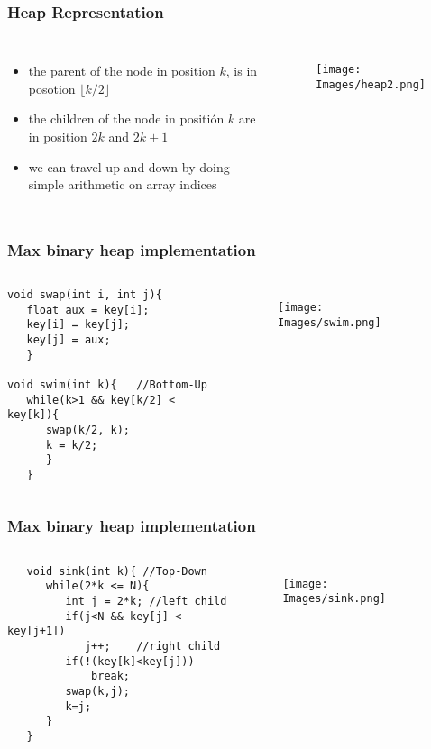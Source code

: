 \documentclass{beamer}
\begin{document}
\begin{frame}
\frametitle{Heap Representation}
\begin{columns}[c] %
\begin{itemize}
\item the parent of the node in position $k$, is in posotion $\lfloor k/2 \rfloor$
\item the children of the node in positión $k$ are in position $2k$ and $2k+1$
\item we can travel up and down by doing simple arithmetic on array indices
\end{itemize}
\begin{figure}[h]
\texttt{[image: Images/heap2.png]}
\centering
\end{figure}
\end{columns}

\end{frame}
\begin{frame}[fragile]
\frametitle{Max binary heap implementation}
\begin{columns}[c]

\begin{lstlisting}
void swap(int i, int j){
   float aux = key[i];
   key[i] = key[j];
   key[j] = aux;
   }
   
void swim(int k){	//Bottom-Up
   while(k>1 && key[k/2] < key[k]){
      swap(k/2, k);
      k = k/2;
      }
   }
\end{lstlisting}
\begin{figure}[h]
\texttt{[image: Images/swim.png]}
\centering
\end{figure}

\end{columns}
\end{frame}
\begin{frame}[fragile]
\frametitle{Max binary heap implementation}
\begin{columns}[c]

\begin{lstlisting}
   void sink(int k){ //Top-Down
      while(2*k <= N){
         int j = 2*k; //left child
         if(j<N && key[j] < key[j+1])
            j++;    //right child
         if(!(key[k]<key[j]))
             break;
         swap(k,j);
         k=j;
      }
   }
\end{lstlisting}
\begin{figure}[h]
\texttt{[image: Images/sink.png]}
\centering
\end{figure}

\end{columns}
\end{frame}
\end{document}
